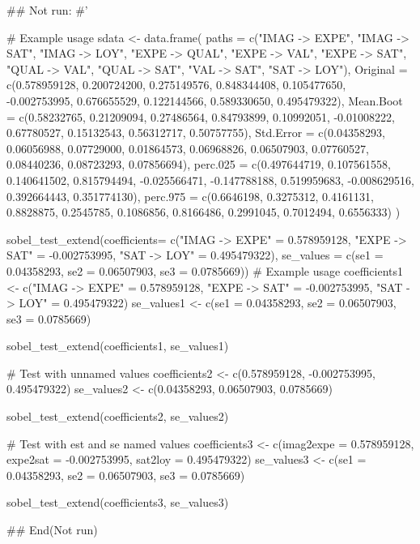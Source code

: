 \documentclass[a4paper]{book}
\begin{document}
\begin{Examples}
\begin{ExampleCode}

\#\# Not run: 
#'

# Example usage
sdata <- data.frame(
  paths = c("IMAG -> EXPE", "IMAG -> SAT",
              "IMAG -> LOY", "EXPE -> QUAL", "EXPE -> VAL", "EXPE -> SAT",
            "QUAL -> VAL", "QUAL -> SAT", "VAL -> SAT", "SAT -> LOY"),
  Original = c(0.578959128, 0.200724200, 0.275149576,
              0.848344408, 0.105477650, -0.002753995,
               0.676655529, 0.122144566, 0.589330650, 0.495479322),
  Mean.Boot = c(0.58232765, 0.21209094, 0.27486564,
                0.84793899, 0.10992051, -0.01008222,
                0.67780527, 0.15132543, 0.56312717, 0.50757755),
  Std.Error = c(0.04358293, 0.06056988, 0.07729000,
                 0.01864573, 0.06968826, 0.06507903,
                0.07760527, 0.08440236, 0.08723293, 0.07856694),
  perc.025 = c(0.497644719, 0.107561558, 0.140641502,
                0.815794494, -0.025566471, -0.147788188,
               0.519959683, -0.008629516, 0.392664443, 0.351774130),
  perc.975 = c(0.6646198, 0.3275312, 0.4161131,
                0.8828875, 0.2545785, 0.1086856,
               0.8166486, 0.2991045, 0.7012494, 0.6556333)
)



sobel_test_extend(coefficients= c("IMAG -> EXPE" = 0.578959128,
                                  "EXPE -> SAT" = -0.002753995,
                                  "SAT -> LOY" = 0.495479322),
                  se_values = c(se1 = 0.04358293,
                                se2 = 0.06507903,
                                se3 = 0.0785669))
# Example usage
coefficients1 <- c("IMAG -> EXPE" = 0.578959128,
                  "EXPE -> SAT" = -0.002753995, "SAT -> LOY" = 0.495479322)
se_values1 <- c(se1 = 0.04358293, se2 = 0.06507903, se3 = 0.0785669)

sobel_test_extend(coefficients1, se_values1)


# Test with unnamed values
coefficients2 <- c(0.578959128, -0.002753995, 0.495479322)
se_values2 <- c(0.04358293, 0.06507903, 0.0785669)

sobel_test_extend(coefficients2, se_values2)


# Test with est and se named values
coefficients3 <- c(imag2expe = 0.578959128,
                  expe2sat = -0.002753995, sat2loy = 0.495479322)
se_values3 <- c(se1 = 0.04358293, se2 = 0.06507903, se3 = 0.0785669)

sobel_test_extend(coefficients3, se_values3)




## End(Not run)


\end{ExampleCode}
\end{Examples}
\end{document}

